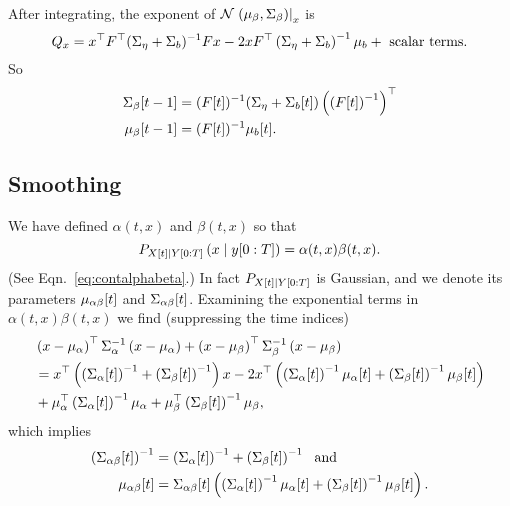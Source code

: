After integrating, the exponent of
${\mathcal{N}}\left.\left(\mu_\beta,\Sigma_\beta\right)\right|_{x}$ is
\begin{equation*}
  Q_x = x^\top F^\top (\Sigma_\eta + \Sigma_b)^{-1} Fx - 2x
  F^\top \left(\Sigma_\eta + \Sigma_b \right)^{-1}\mu_b +
  \text{ scalar terms}. 
\end{equation*}
So
\begin{align*}
  {\Sigma_\beta}{[t-1]} &= ({F}{[t]})^{-1} ( \Sigma_\eta +
  {\Sigma_b}{[t]} ) \left( \left( {F}{[t]} \right)^{-1}
  \right)^\top
  \\
  {\mu_\beta}{[t-1]} &= ({F}{[t]})^{-1}{\mu_b}{[t]}.
\end{align*}

\subsection{Smoothing}
\label{sec:DetailSmoothing}

We have defined $\alpha(t,x)$ and $\beta(t,x)$ so that
\begin{equation*}
   P_{{X}{[t]}\mid Y[0:T]} \left(x\mid y[0:T] \right) =
   \alpha(t,x) \beta(t,x).
\end{equation*}
(See Eqn.~\eqref{eq:contalphabeta}.)  In fact
$P_{{X}{[t]}\mid Y[0:T]}$ is Gaussian, and we denote its parameters
${\mu_{\alpha \beta}}{[t]}$ and ${\Sigma_{\alpha \beta}}{[t]}$.
Examining the exponential terms in $\alpha(t,x) \beta(t,x)$ we find
(suppressing the time indices)
\begin{align*}
  &\left( x - \mu_\alpha \right)^\top \Sigma_\alpha^{-1} \left( x
    - \mu_\alpha \right) + \left( x - \mu_\beta \right)^\top
  \Sigma_\beta^{-1} \left( x - \mu_\beta \right)\\
  & = x^\top \left( \left( {\Sigma_{\alpha}}{[t]} \right)^{-1} + \left(
      {\Sigma_{\beta}}{[t]} \right)^{-1} \right) x - 2x^\top
  \left( \left( {\Sigma_{\alpha}}{[t]} \right)^{-1}
  {\mu_{\alpha}}{[t]} + \left( {\Sigma_{\beta}}{[t]} \right)^{-1}
  {\mu_{\beta}}{[t]} \right) \\
& + \mu_\alpha^\top  \left(
  {\Sigma_{\alpha}}{[t]} \right)^{-1} \mu_\alpha +
  \mu_\beta^\top  \left( {\Sigma_{\beta}}{[t]} \right)^{-1}
  \mu_\beta ,
\end{align*}
which implies
\begin{subequations}
  \begin{align}
    \left( {\Sigma_{\alpha \beta}}{[t]} \right)^{-1} &= \left(
      {\Sigma_{\alpha}}{[t]} \right)^{-1} + \left(
      {\Sigma_{\beta}}{[t]} \right)^{-1} ~\text{ and} \\
    {\mu_{\alpha \beta}}{[t]} &=
    {\Sigma_{\alpha \beta}}{[t]} \left( \left(
        {\Sigma_{\alpha}}{[t]} \right)^{-1} {\mu_{\alpha}}{[t]} +
      \left( {\Sigma_{\beta}}{[t]} \right)^{-1} {\mu_{\beta}}{[t]}
    \right).
\end{align}
\end{subequations}

